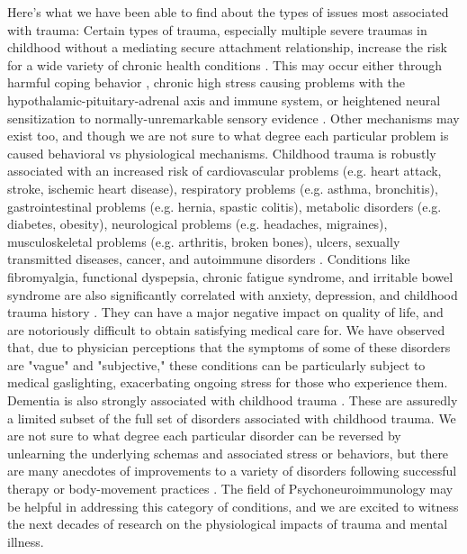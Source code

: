\documentclass[12pt,letterpaper]{book}
\begin{document}
Here's what we have been able to find about the types of issues most associated with trauma: Certain types of trauma, especially multiple severe traumas in childhood without a mediating secure attachment relationship, increase the risk for a wide variety of chronic health conditions \cite{harris2018deepest}. This may occur either through harmful coping behavior \cite{felittiACE}, chronic high stress causing problems with the hypothalamic-pituitary-adrenal axis \cite{CSAHealth} and immune system, or heightened neural sensitization to normally-unremarkable sensory evidence \cite{karimov2024childhood,fitzcharles2021nociplastic}. Other mechanisms may exist too, and though we are not sure to what degree each particular problem is caused behavioral vs physiological mechanisms. Childhood trauma is robustly associated with an increased risk of cardiovascular problems (e.g. heart attack, stroke, ischemic heart disease), respiratory problems (e.g. asthma, bronchitis), gastrointestinal problems (e.g. hernia, spastic colitis), metabolic disorders (e.g. diabetes, obesity), neurological problems (e.g. headaches, migraines), musculoskeletal problems (e.g. arthritis, broken bones), ulcers, sexually transmitted diseases, cancer, and autoimmune disorders \cite{wegman2009meta,norman2012long,hughes2017effect}. Conditions like fibromyalgia, functional dyspepsia, chronic fatigue syndrome, and irritable bowel syndrome are also significantly correlated with anxiety, depression, and childhood trauma history \cite{henningsenSomatic,gardoki2022prevalence,silvernale2024relationship}. They can have a major negative impact on quality of life, and are notoriously difficult to obtain satisfying medical care for. We have observed that, due to physician perceptions that the symptoms of some of these disorders are "vague" and "subjective," these conditions can be particularly subject to medical gaslighting, exacerbating ongoing stress for those who experience them. Dementia is also strongly associated with childhood trauma \cite{severs2023traumatic}. These are assuredly a limited subset of the full set of disorders associated with childhood trauma. We are not sure to what degree each particular disorder can be reversed by unlearning the underlying schemas and associated stress or behaviors, but there are many anecdotes of improvements to a variety of disorders following successful therapy or body-movement practices \cite{vanderKolkBody}. The field of Psychoneuroimmunology may be helpful in addressing this category of conditions, and we are excited to witness the next decades of research on the physiological impacts of trauma and mental illness.
\end{document}
